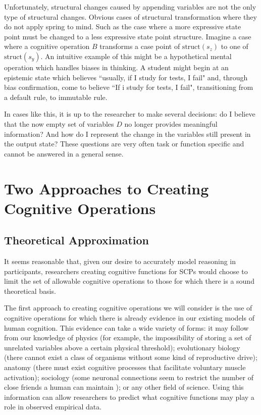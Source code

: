 {Unfortunately, structural changes caused by appending variables are not the only type of structural changes. Obvious cases of structural transformation where they do not apply spring to mind. Such as the case where a more expressive state point must be changed to a less expressive state point structure. Imagine a case where a cognitive operation $B$ transforms a case point of $\textrm{struct}(s_z)$ to one of $\textrm{struct}(s_y)$. An intuitive example of this might be a hypothetical mental operation which handles biases in thinking. A student might begin at an epistemic state which believes ``usually, if I study for tests, I fail" and, through bias confirmation, come to believe ``If i study for tests, I fail", transitioning from a default rule, to immutable rule. 

In cases like this, it is up to the researcher to make several decisions: do I believe that the now empty set of variables $D$ no longer provides meaningful information? And how do I represent the change in the variables still present in the output state? These questions are very often task or function specific and cannot be answered in a general sense.

\section{Two Approaches to Creating Cognitive Operations}
\subsection{Theoretical Approximation}
It seems reasonable that, given our desire to accurately model reasoning in participants, researchers creating cognitive functions for SCPs would choose to limit the set of allowable cognitive operations to those for which there is a sound theoretical basis.

The first approach to creating cognitive operations we will consider is the use of cognitive operations for which there is already evidence in our existing models of human cognition. This evidence can take a wide variety of forms: it may follow from our knowledge of physics (for example, the impossibility of storing a set of unrelated variables above a certain physical threshold); evolutionary biology (there cannot exist a class of organisms without some kind of reproductive drive); anatomy (there must exist cognitive processes that facilitate voluntary muscle activation); sociology (some neuronal connections seem to restrict the number of close friends a human can maintain \citep{gonccalves2011modeling}); or any other field of science. Using this information can allow researchers to predict what cognitive functions may play a role in observed empirical data. 

}
